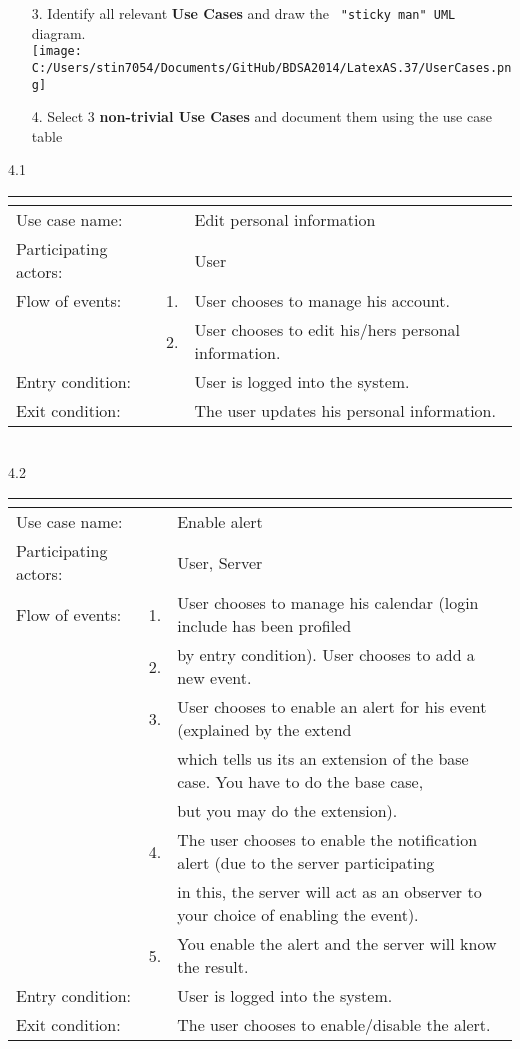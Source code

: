 \documentclass{article}
\begin{document}
	\begin{enumerate}
		\item[3.] Identify all  relevant \textbf{Use Cases} and draw the \verb= "sticky man" UML= diagram.\\
		\texttt{[image: C:/Users/stin7054/Documents/GitHub/BDSA2014/LatexAS.37/UserCases.png]}\\
		\pagebreak{}
		\item[4.] Select 3 \textbf{non-trivial Use Cases} and document them using the use case table\\
	\end{enumerate}
	4.1\\
\begin{tabular}{l r @{} l}
	\multicolumn{2}{c}{} \\
	\hline
	Use case name:	&&Edit personal information\\
	\hline
	Participating actors:&&User \\
	\hline
	Flow of events:	&1.&User chooses to manage his account.\\
				&2.&User chooses to edit his/hers personal information.\\
	\hline
	Entry condition:	&&User is logged into the system.\\
	\hline
	Exit condition:	&&The user updates his personal information.\\
	\hline
\end{tabular}
	\\
	4.2\\
\begin{tabular}{l r @{} l}
	\multicolumn{2}{c}{} \\
	\hline
	Use case name:	&&Enable alert\\
	\hline
	Participating actors:&&User, Server \\
	\hline
	Flow of events:	&1.&User chooses to manage his calendar (login include has been profiled\\
				&2.&by entry condition). User chooses to add a new event.\\
				&3.&User chooses to enable an alert for his event (explained by the \flqq extend\frqq\\
					&& which tells us its an extension of the base case. You have to do the base case,\\
					&& but you may do the extension).\\
				&4.&The user chooses to enable the notification alert (due to the server participating\\
					&& in this, the server will act as an observer to your choice of enabling the event).\\
				&5.&You enable the alert and the server will know the result.\\
	\hline
	Entry condition:	&&User is logged into the system.\\
	\hline
	Exit condition:	&&The user chooses to enable/disable the alert.\\
	\hline
\end{tabular}
\end{document}

